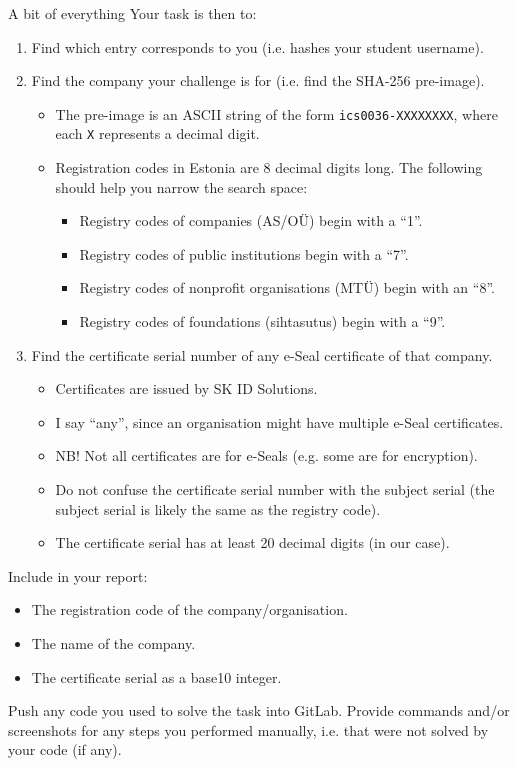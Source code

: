\documentclass{homework}
\begin{document}
\begin{task}{A bit of everything}
  Your task is then to:
  \begin{enumerate}
    \item Find which entry corresponds to you (i.e. hashes your student username).
    \item Find the company your challenge is for (i.e. find the SHA-256 pre-image).
    \begin{itemize}
      \item The pre-image is an ASCII string of the form \texttt{ics0036-XXXXXXXX}, where each \texttt{X} represents a decimal digit.
      \item Registration codes in Estonia are 8 decimal digits long.
            The following should help you narrow the search space:
            \begin{itemize}
              \item Registry codes of companies (AS/OÜ) begin with a \enquote{1}.
              \item Registry codes of public institutions begin with a \enquote{7}.
              \item Registry codes of nonprofit organisations (MTÜ) begin with an \enquote{8}.
              \item Registry codes of foundations (sihtasutus) begin with a \enquote{9}.
            \end{itemize}
    \end{itemize}
    \item Find the certificate serial number of any e-Seal certificate of that company.
    \begin{itemize}
      \item Certificates are issued by SK ID Solutions.
      \item I say \enquote{any}, since an organisation might have multiple e-Seal certificates.
      \item NB! Not all certificates are for e-Seals (e.g. some are for encryption).
      \item Do not confuse the certificate serial number with the subject serial (the subject serial is likely the same as the registry code).
      \item The certificate serial has at least 20 decimal digits (in our case).
    \end{itemize}
  \end{enumerate}

  Include in your report:
  \begin{itemize}
    \item The registration code of the company/organisation.
    \item The name of the company.
    \item The certificate serial as a base10 integer.
  \end{itemize}

  Push any code you used to solve the task into GitLab.
  Provide commands and/or screenshots for any steps you performed manually, i.e. that were not solved by your code (if any).
\end{task}
\end{document}
